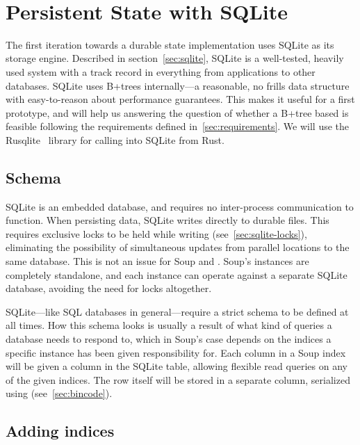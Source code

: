  \\

\section{Persistent State with SQLite}
The first iteration towards a durable state implementation uses SQLite as its
storage engine. Described in section~\ref{sec:sqlite}, SQLite is a well-tested,
heavily used system with a track record in everything from applications to other
databases. SQLite uses B+trees internally---a reasonable, no frills data
structure with easy-to-reason about performance guarantees. This makes it useful
for a first prototype, and will help us answering the question of whether a
B+tree based  is feasible following the requirements
defined in~\ref{sec:requirements}. We will use the Rusqlite~\cite{rusqlite}
library for calling into SQLite from Rust.

\subsection{Schema}

SQLite is an embedded database, and requires no inter-process communication to
function. When persisting data, SQLite writes directly to durable files. This
requires exclusive locks to be held while writing (see~\ref{sec:sqlite-locks}),
eliminating the possibility of simultaneous updates from parallel locations to
the same database. This is not an issue for Soup and .
Soup's  instances are completely standalone, and each
 instance can operate against a separate SQLite database,
avoiding the need for locks altogether.

SQLite---like SQL databases in general---require a strict schema to be defined
at all times. How this schema looks is usually a result of what kind of queries
a database needs to respond to, which in Soup's case depends on the indices a
specific  instance has been given responsibility for. Each column in
a Soup index will be given a column in the SQLite table, allowing flexible read
queries on any of the given indices. The row itself will be stored in a separate
column, serialized using  (see~\ref{sec:bincode}).

\subsection{Adding indices}

